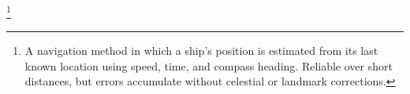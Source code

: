 \footnote{A navigation method in which a ship's position is estimated from its last known location using speed, time, and compass heading. Reliable over short distances, but errors accumulate without celestial or landmark corrections.}